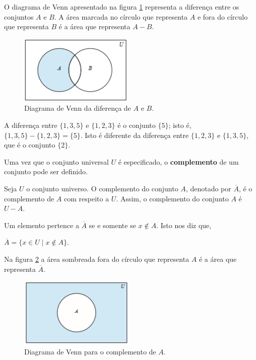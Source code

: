 O diagrama de Venn apresentado na figura \ref{fig33} representa a diferença
entre os conjuntos $A$ e $B$. A área marcada no círculo que representa $A$ e
fora do círculo que representa $B$ é a área que representa $A-B$.

\begin{figure}[H]
	\centering
	\includegraphics[scale=2]{chapter/imagens/33}
	\caption{Diagrama de Venn da diferença de $A$ e $B$.}
	\label{fig33}
\end{figure}

\begin{exmp}
\label{exem322}
A diferença entre $\{1,3,5\}$ e $\{1,2,3\}$ é o conjunto $\{5\}$; isto é,
$\{1,3,5\}-\{1,2,3\} = \{5\}$. Isto é diferente da diferença entre $\{1,2,3\}$ e
$\{1,3,5\}$, que é o conjunto $\{2\}$.
\end{exmp}

Uma vez que o conjunto universal $U$ é especificado, o \textbf{complemento} de
um conjunto pode ser definido.

\begin{defn}
\label{def314}
Seja $U$ o conjunto universo. O complemento do conjunto $A$, denotado por
$\overline{A}$, é o complemento de $A$ com respeito a $U$. Assim, o complemento
do conjunto $A$ é $U - A$.
\end{defn}

Um elemento pertence a $\overline{A}$ se e somente se $x \notin A$. Isto nos diz
que,
\begin{center}
$\overline{A} = \{x \in U \mid x \notin A\}$.
\end{center}

Na figura \ref{fig34} a área sombreada fora do círculo que representa $A$ é a
área que representa $\overline{A}$.

\begin{figure}[H]
	\centering
	\includegraphics[scale=2]{chapter/imagens/34}
	\caption{Diagrama de Venn para o complemento de $A$.}
	\label{fig34}
\end{figure}


